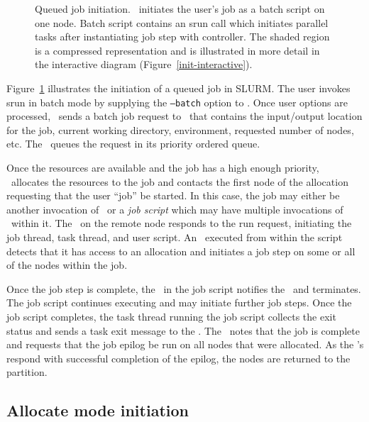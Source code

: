 \begin{figure}[tb]
\centerline{ }
\caption{\small Queued job initiation. 
         \slurmctld\ initiates the user's job as a batch script on one node. 
	 Batch script contains an srun call which initiates parallel tasks 
	 after instantiating job step with controller. The shaded region is 
	 a compressed representation and is illustrated in more detail in the 
	 interactive diagram (Figure~\ref{init-interactive}).}
\label{init-batch}
\end{figure}

Figure~\ref{init-batch} illustrates the initiation of a queued job in SLURM.
The user invokes srun in batch mode by supplying the {\tt --batch} option 
to \srun . Once user options are processed, \srun\ sends a batch job request
to \slurmctld\ that contains the input/output location for the job, current
working directory, environment, requested number of nodes, etc. The 
\slurmctld\ queues the request in its priority ordered queue. 

Once the resources are available and the job has a high enough priority,
\slurmctld\ allocates the resources to the job and contacts the first node 
of the allocation requesting that the user ``job'' be started. In this case,
the job may either be another invocation of \srun\ or a {\em job script} which
may have multiple invocations of \srun\ within it. The \slurmd\ on the remote
node responds to the run request, initiating the job thread, task thread, 
and user script. An \srun\ executed from within the script detects that it
has access to an allocation and initiates a job step on some or all of the
nodes within the job.

Once the job step is complete, the \srun\ in the job script notifies the
\slurmctld\, and terminates. The job script continues executing and may
initiate further job steps. Once the job script completes, the task
thread running the job script collects the exit status and sends a task exit
message to the \slurmctld . The \slurmctld\ notes that the job is complete
and requests that the job epilog be run on all nodes that were allocated.
As the \slurmd 's respond with successful completion of the epilog, 
the nodes are returned to the partition.

\subsection{Allocate mode initiation}

